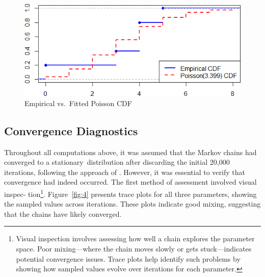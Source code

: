 \documentclass{Class/julia}
\begin{document}
\begin{figure}[!ht]
    \centering
    \caption{Empirical vs.\ Fitted Poisson CDF}
    \label{fig:3}
    \includegraphics[width=.75\textwidth]{rytgaard1990/empirical_vs_poisson.png}
\end{figure}

\subsection{Convergence Diagnostics}

Throughout all computations above, it was assumed that the Markov chains had converged to a stationary~distribution after discarding the initial 20,000 iterations, following the approach of \citet{dudley2006bayesian}. However, it was essential to verify that convergence had indeed occurred. The first method of assessment involved visual inspec- tion\footnote{Visual inspection involves assessing how well a chain explores the parameter space. Poor mixing—where the chain moves slowly or gets stuck—indicates potential convergence issues. Trace plots help identify such problems by showing how sampled values evolve over iterations for each parameter.}. Figure~\ref{fig:4} presents trace plots for all three parameters, showing the sampled values across iterations. These plots indicate good mixing, suggesting that the chains have likely converged.
\end{document}
